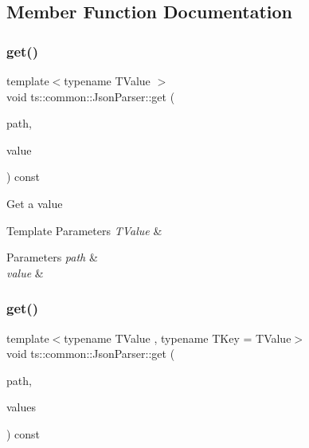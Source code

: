 \subsection{Member Function Documentation}
\mbox{\label{classts_1_1common_1_1_json_parser_a08607becc24052fb2c08cf583ac9b735}} 
\subsubsection{\texorpdfstring{get()}{get()}\hspace{0.1cm}{\footnotesize\ttfamily [1/3]}}
{\footnotesize\ttfamily template$<$typename T\+Value $>$ \\
void ts\+::common\+::\+Json\+Parser\+::get (\begin{DoxyParamCaption}\item[{std\+::string const \&}]{path,  }\item[{T\+Value \&}]{value }\end{DoxyParamCaption}) const\hspace{0.3cm}{\ttfamily [inline]}}

Get a value 
\begin{DoxyTemplParams}{Template Parameters}
{\em T\+Value} & \\
\hline
\end{DoxyTemplParams}

\begin{DoxyParams}{Parameters}
{\em path} & \\
\hline
{\em value} & \\
\hline
\end{DoxyParams}
\mbox{\label{classts_1_1common_1_1_json_parser_a3422774a1df58bbb3de563872f2d3841}} 
\subsubsection{\texorpdfstring{get()}{get()}\hspace{0.1cm}{\footnotesize\ttfamily [2/3]}}
{\footnotesize\ttfamily template$<$typename T\+Value , typename T\+Key  = T\+Value$>$ \\
void ts\+::common\+::\+Json\+Parser\+::get (\begin{DoxyParamCaption}\item[{std\+::string const \&}]{path,  }\item[{std\+::vector$<$ std\+::pair$<$ T\+Key, T\+Value $>$$>$ \&}]{values }\end{DoxyParamCaption}) const\hspace{0.3cm}{\ttfamily [inline]}}

